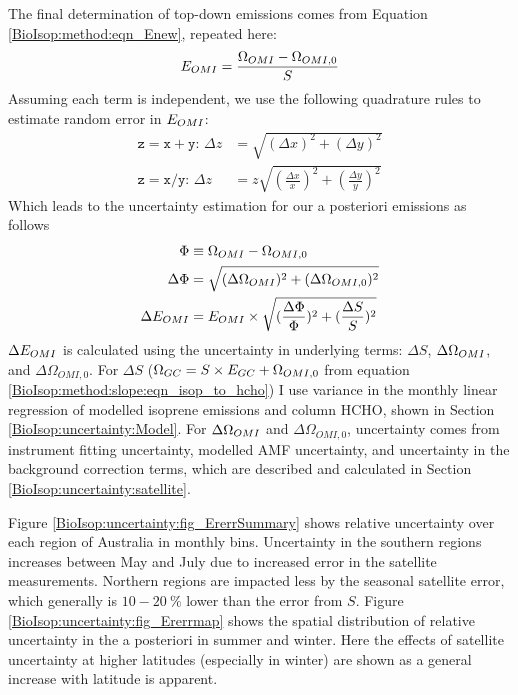     The final determination of top-down emissions comes from Equation \ref{BioIsop:method:eqn_Enew}, repeated here: 
    \begin{equation*}
      E_{OMI}=\frac{\Omega_{OMI} - \Omega_{OMI,0}}{S}
    \end{equation*}
    Assuming each term is independent, we use the following quadrature rules to estimate random error in $E_{OMI}$:
    \begin{align}
      \mathtt{z=x+y:} \, \Delta{z} & = \sqrt{(\Delta{x})^2 + (\Delta{y})^2} \label{BioIsop:uncertainty:eqn_quadrature_add} \\
      \mathtt{z=x/y:} \, \Delta{z} & = z \sqrt{(\frac{\Delta{x}}{x})^2 + (\frac{\Delta{y}}{y})^2} \label{BioIsop:uncertainty:eqn_quadrature_divide} 
    \end{align}
    Which leads to the uncertainty estimation for our a posteriori emissions as follows
    \begin{align}
      \Phi & \equiv \Omega_{OMI} - \Omega_{OMI,0}   \notag \\
      \Delta{\Phi} & = \sqrt{(\Delta{\Omega_{OMI}})^2 + (\Delta{\Omega_{OMI,0}})^2}  \label{BioIsop:uncertainty:eomi:eqn_delta_Phi} \\
      \Delta{E_{OMI}} &= E_{OMI} \times \sqrt{(\frac{\Delta{\Phi}}{\Phi})^2 + (\frac{\Delta{S}}{S})^2} \label{BioIsop:uncertainty:eomi:eqn_delta_apost}
    \end{align}
    $\Delta{E_{OMI}}$ is calculated using the uncertainty in underlying terms: $\Delta{S}$, $\Delta{\Omega_{OMI}}$, and $\Delta{\Omega_{OMI,0}}$. 
    For $\Delta{S}$ ($\Omega_{GC} = S \times E_{GC} + \Omega_{OMI,0}$ from equation \ref{BioIsop:method:slope:eqn_isop_to_hcho}) I use variance in the monthly linear regression of modelled isoprene emissions and column HCHO, shown in Section \ref{BioIsop:uncertainty:Model}.
    For $\Delta \Omega_{OMI}$ and $\Delta \Omega_{OMI,0}$, uncertainty comes from instrument fitting uncertainty, modelled AMF uncertainty, and uncertainty in the background correction terms, which are described and calculated in Section \ref{BioIsop:uncertainty:satellite}.
    
    
    Figure \ref{BioIsop:uncertainty:fig_ErerrSummary} shows relative uncertainty over each region of Australia in monthly bins.
    Uncertainty in the southern regions increases between May and July due to increased error in the satellite measurements.
    Northern regions are impacted less by the seasonal satellite error, which generally is $10-20~\%$ lower than the error from $S$.
    Figure \ref{BioIsop:uncertainty:fig_Ererrmap} shows the spatial distribution of relative uncertainty in the a posteriori in summer and winter.
    Here the effects of satellite uncertainty at higher latitudes (especially in winter) are shown as a general increase with latitude is apparent.
    
